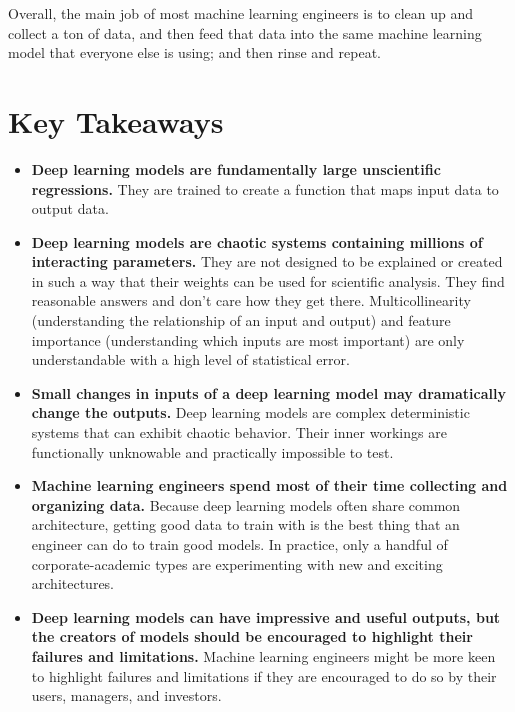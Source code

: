 Overall, the main job of most machine learning engineers is to clean up and collect a ton of data, and then feed that data into the same machine learning model that everyone else is using; and then rinse and repeat.

\section{Key Takeaways}

\begin{itemize}
    \item \textbf{Deep learning models are fundamentally large unscientific regressions.} They are trained to create a function that maps input data to output data.
    \item \textbf{Deep learning models are chaotic systems containing millions of interacting parameters.} They are not designed to be explained or created in such a way that their weights can be used for scientific analysis. They find reasonable answers and don’t care how they get there. Multicollinearity (understanding the relationship of an input and output) and feature importance (understanding which inputs are most important) are only understandable with a high level of statistical error.
    \item \textbf{Small changes in inputs of a deep learning model may dramatically change the outputs.} Deep learning models are complex deterministic systems that can exhibit chaotic behavior. Their inner workings are functionally unknowable and practically impossible to test.
    \item \textbf{Machine learning engineers spend most of their time collecting and organizing data.} Because deep learning models often share common architecture, getting good data to train with is the best thing that an engineer can do to train good models. In practice, only a handful of corporate-academic types are experimenting with new and exciting architectures.
    \item \textbf{Deep learning models can have impressive and useful outputs, but the creators of models should be encouraged to highlight their failures and limitations.} Machine learning engineers might be more keen to highlight failures and limitations if they are encouraged to do so by their users, managers, and investors.
\end{itemize}

